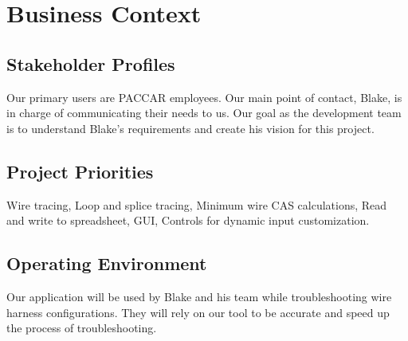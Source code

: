 \section{Business Context}

\subsection{Stakeholder Profiles}
Our primary users are PACCAR employees. Our main point of contact, Blake, is in
charge of communicating their needs to us. Our goal as the development team is to
understand Blake's requirements and create his vision for this project.

\subsection{Project Priorities}
Wire tracing,
Loop and splice tracing,
Minimum wire CAS calculations,
Read and write to spreadsheet,
GUI,
Controls for dynamic input customization.


\subsection{Operating Environment}
 Our application will be used by Blake and his team while troubleshooting wire harness configurations.
 They will rely on our tool to be accurate and speed up the process of troubleshooting.
